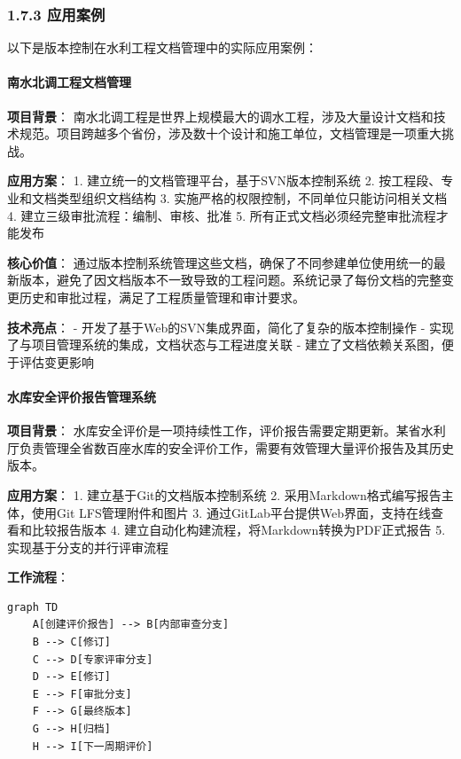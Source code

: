 \subsubsection{1.7.3 应用案例}\label{ux5e94ux7528ux6848ux4f8b}

以下是版本控制在水利工程文档管理中的实际应用案例：

\paragraph{南水北调工程文档管理}\label{ux5357ux6c34ux5317ux8c03ux5de5ux7a0bux6587ux6863ux7ba1ux7406}

\textbf{项目背景}：
南水北调工程是世界上规模最大的调水工程，涉及大量设计文档和技术规范。项目跨越多个省份，涉及数十个设计和施工单位，文档管理是一项重大挑战。

\textbf{应用方案}： 1. 建立统一的文档管理平台，基于SVN版本控制系统 2.
按工程段、专业和文档类型组织文档结构 3.
实施严格的权限控制，不同单位只能访问相关文档 4.
建立三级审批流程：编制、审核、批准 5.
所有正式文档必须经完整审批流程才能发布

\textbf{核心价值}：
通过版本控制系统管理这些文档，确保了不同参建单位使用统一的最新版本，避免了因文档版本不一致导致的工程问题。系统记录了每份文档的完整变更历史和审批过程，满足了工程质量管理和审计要求。

\textbf{技术亮点}： -
开发了基于Web的SVN集成界面，简化了复杂的版本控制操作 -
实现了与项目管理系统的集成，文档状态与工程进度关联 -
建立了文档依赖关系图，便于评估变更影响

\paragraph{水库安全评价报告管理系统}\label{ux6c34ux5e93ux5b89ux5168ux8bc4ux4ef7ux62a5ux544aux7ba1ux7406ux7cfbux7edf}

\textbf{项目背景}：
水库安全评价是一项持续性工作，评价报告需要定期更新。某省水利厅负责管理全省数百座水库的安全评价工作，需要有效管理大量评价报告及其历史版本。

\textbf{应用方案}： 1. 建立基于Git的文档版本控制系统 2.
采用Markdown格式编写报告主体，使用Git LFS管理附件和图片 3.
通过GitLab平台提供Web界面，支持在线查看和比较报告版本 4.
建立自动化构建流程，将Markdown转换为PDF正式报告 5.
实现基于分支的并行评审流程

\textbf{工作流程}：

\begin{lstlisting}
graph TD
    A[创建评价报告] --> B[内部审查分支]
    B --> C[修订]
    C --> D[专家评审分支]
    D --> E[修订]
    E --> F[审批分支]
    F --> G[最终版本]
    G --> H[归档]
    H --> I[下一周期评价]
\end{lstlisting}

